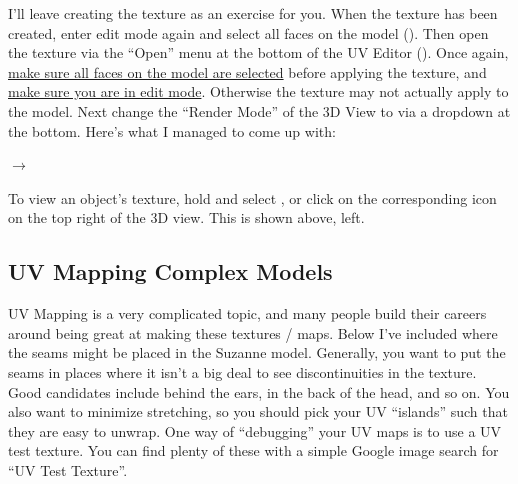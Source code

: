 \documentclass[11pt]{article}
\begin{document}
I'll leave creating the texture as an exercise for you.  When the texture has been created, enter
edit mode again and select all faces on the model ().  Then open the texture via the ``Open''
menu at the bottom of the UV Editor ().
Once again, \underline{make sure all faces on the model are selected} before applying the texture,
and \underline{make sure you are in edit mode}.  Otherwise the texture may not actually apply to the model.
Next change the ``Render Mode'' of the 3D View to  via a dropdown at the bottom.
Here's what I managed to come up with:
\begin{center}
     $\rightarrow$
\end{center}
To view an object's texture, hold  and select , or click on the corresponding
icon on the top right of the 3D view.  This is shown above, left.
\subsection{UV Mapping Complex Models}

UV Mapping is a very complicated topic, and many people build their careers around being great at 
making these textures / maps.  Below I've included where the seams might be placed in the Suzanne
model.  Generally, you want to put the seams in places where it isn't a big deal to see 
discontinuities in the texture.  Good candidates include behind the ears, in the back of the head,
and so on.  You also want to minimize stretching, so you should pick your UV ``islands'' such that
they are easy to unwrap.  One way of ``debugging'' your UV maps is to use a UV test texture.  You
can find plenty of these with a simple Google image search for ``UV Test Texture''.
\end{document}

